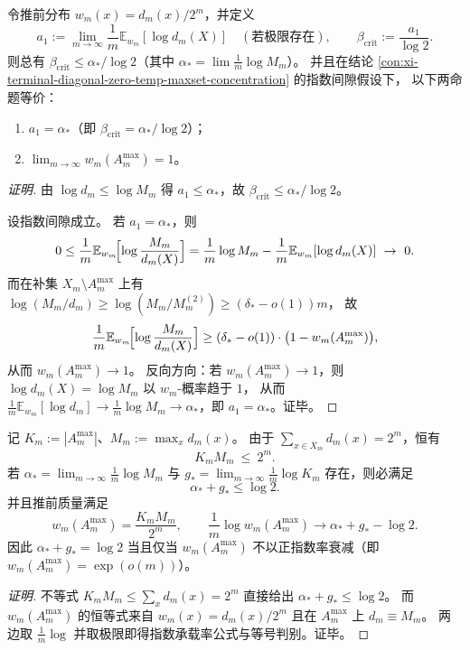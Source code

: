 \begin{conclusion}[\texorpdfstring{$\beta_{\mathrm{crit}}=\alpha_\ast/\log 2$}{beta_crit=alpha*/log2} 的判别：当且仅当推前 \texorpdfstring{$w_m$}{w_m} 在指数尺度上冻结到最大纤维集合]\label{con:xi-terminal-typical-extreme-coaxial-freeze-criterion}
令推前分布 \(w_m(x)=d_m(x)/2^m\)，并定义
\[
a_1:=\lim_{m\to\infty}\frac{1}{m}\mathbb E_{w_m}[\log d_m(X)]\quad(\text{若极限存在}),
\qquad
\beta_{\mathrm{crit}}:=\frac{a_1}{\log2}.
\]
则总有 \(\beta_{\mathrm{crit}}\le \alpha_\ast/\log2\)（其中 \(\alpha_\ast=\lim\frac{1}{m}\log M_m\)）。
并且在结论 \ref{con:xi-terminal-diagonal-zero-temp-maxset-concentration} 的指数间隙假设下，
以下两命题等价：
\begin{enumerate}
  \item \(a_1=\alpha_\ast\)（即 \(\beta_{\mathrm{crit}}=\alpha_\ast/\log2\)）；
  \item \(\lim_{m\to\infty} w_m(A_m^{\max})=1\)。
\end{enumerate}
\end{conclusion}
\begin{proof}[证明]
由 \(\log d_m\le \log M_m\) 得 \(a_1\le \alpha_\ast\)，故 \(\beta_{\mathrm{crit}}\le \alpha_\ast/\log2\)。
\par
设指数间隙成立。
若 \(a_1=\alpha_\ast\)，则
\[
0\le \frac{1}{m}\mathbb E_{w_m}\!\Bigl[\log\frac{M_m}{d_m(X)}\Bigr]
=\frac{1}{m}\log M_m-\frac{1}{m}\mathbb E_{w_m}[\log d_m(X)]\ \to\ 0.
\]
而在补集 \(X_m\setminus A_m^{\max}\) 上有 \(\log(M_m/d_m)\ge \log(M_m/M_m^{(2)})\ge (\delta_\ast-o(1))m\)，
故
\[
\frac{1}{m}\mathbb E_{w_m}\!\Bigl[\log\frac{M_m}{d_m(X)}\Bigr]
\ge (\delta_\ast-o(1))\cdot\bigl(1-w_m(A_m^{\max})\bigr),
\]
从而 \(w_m(A_m^{\max})\to 1\)。
反向方向：若 \(w_m(A_m^{\max})\to 1\)，则 \(\log d_m(X)=\log M_m\) 以 \(w_m\)-概率趋于 \(1\)，
从而 \(\frac1m\mathbb E_{w_m}[\log d_m]\to \frac1m\log M_m\to\alpha_\ast\)，即 \(a_1=\alpha_\ast\)。证毕。
\end{proof}

\begin{conclusion}[极端--简并不等式：\texorpdfstring{$\alpha_\ast+g_\ast\le \log2$}{alpha*+g*<=log2} 的刚性与最大集合的指数承载率]\label{con:xi-terminal-extreme-degeneracy-inequality}
记 \(K_m:=|A_m^{\max}|\)、\(M_m:=\max_x d_m(x)\)。
由于 \(\sum_{x\in X_m}d_m(x)=2^m\)，恒有
\[
K_m M_m\ \le\ 2^m.
\]
若 \(\alpha_\ast=\lim_{m\to\infty}\frac{1}{m}\log M_m\) 与 \(g_\ast=\lim_{m\to\infty}\frac{1}{m}\log K_m\) 存在，则必满足
\[
\alpha_\ast+g_\ast\le\log2.
\]
并且推前质量满足
\[
w_m(A_m^{\max})=\frac{K_mM_m}{2^m},
\qquad
\frac{1}{m}\log w_m(A_m^{\max})\longrightarrow \alpha_\ast+g_\ast-\log2.
\]
因此 \(\alpha_\ast+g_\ast=\log2\) 当且仅当 \(w_m(A_m^{\max})\) 不以正指数率衰减（即 \(w_m(A_m^{\max})=\exp(o(m))\)）。
\end{conclusion}
\begin{proof}[证明]
不等式 \(K_mM_m\le\sum_x d_m(x)=2^m\) 直接给出 \(\alpha_\ast+g_\ast\le\log2\)。
而 \(w_m(A_m^{\max})\) 的恒等式来自 \(w_m(x)=d_m(x)/2^m\) 且在 \(A_m^{\max}\) 上 \(d_m\equiv M_m\)。
两边取 \(\frac1m\log\) 并取极限即得指数承载率公式与等号判别。证毕。
\end{proof}

